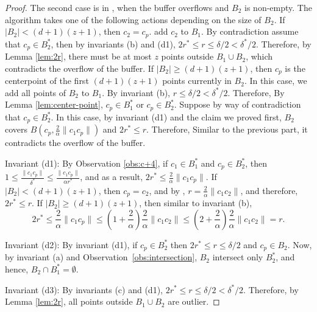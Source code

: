 \documentclass[envcountsame]{cls/cccg15}
\newcommand{\dz}{(d + 1)(z + 1)}
\newcommand{\len}[1]{\|{#1}\|}
\newcommand{\radius}[1]{\frac{2}{\alpha} \len{c_1 #1}}
\newcommand{\lee}{\leqslant}
\newcommand{\gee}{\geqslant}
\renewcommand{\leq}{\lee}
\renewcommand{\geq}{\gee}
\renewcommand{\ge}{\gee}
\begin{document}
\begin{proof}
{The second case is in , when the buffer overflows and $B_2$ is non-empty.
The algorithm takes one of the following actions depending on the size of $B_2$.
If $|B_2| < \dz $, then $c_2 = c_p$.  add $c_2$ to $B_1$.
By contradiction assume that $c_p \in B_2^*$, 
then by invariants (b) and (d1), 
$2r^* \leq r \leq \delta/2 < \delta^*/2$. 
Therefore, by Lemma \ref{lem:2r}, there must be at most $z$ points outside $B_1 \cup B_2$,
which contradicts the overflow of the buffer. 
If $|B_2| \geq \dz$, then $c_p$ is the centerpoint of the first $\dz$ points currently in $B_2$. 
In this case, we add all points of $B_2$ to $B_1$. 
By invariant (b), $r \leq \delta/2 < \delta^*/2$. 
Therefore, By Lemma \ref{lem:center-point}, $c_p \in B_1^*$ or $c_p \in B_2^*$. 
Suppose by way of contradiction that $c_p \in B_2^*$. 
In this case, by invariant (d1) and the claim we proved first,
$B_2$ covers $B(c_p, \radius{c_p})$ and $2r^* \leq r$. 
Therefore, Similar to the previous part, it contradicts the overflow of the buffer. 
}

Invariant (d1): 
By Observation \ref{obs:c+4}, if $c_1 \in B_1^*$ and $c_p \in B_2^*$,
then $1 \leq \frac{\len{c_1 c_p}}{\delta^*} \leq \frac{\len{c_1 c_p}}{\alpha r^*}$,
and as a result, $2r^* \leq \radius{c_p}$. 
If $|B_2| < \dz$, then $c_p = c_2$, and by , 
$r = \radius{c_2}$, and therefore, $2r^* \leq r$.
If $|B_2| \ge \dz$, then similar to invariant (b), 
$$
	2r^* \leq \radius{c_p} \leq (1 + \frac{2}{\alpha})\radius{c_2} 
	\leq (2 + \frac{2}{\alpha})\radius{c_2} = r.
$$

Invariant (d2): By invariant (d1), if $c_p \in B_2^*$ then $2r^* \leq r \leq \delta /2$ and $c_p \in B_2$. 
Now, by invariant (a) and Observation~\ref{obs:intersection}, 
$B_2$ intersect only $B_2^*$, and hence, $B_2 \cap B_1^* = \emptyset$.

Invariant (d3): By invariants (c) and (d1), $2r^* \leq r \leq \delta/2 < \delta^* /2$. 
Therefore, by Lemma \ref{lem:2r}, all points outside $B_1 \cup B_2$ are outlier.
\end{proof}

\end{document}
